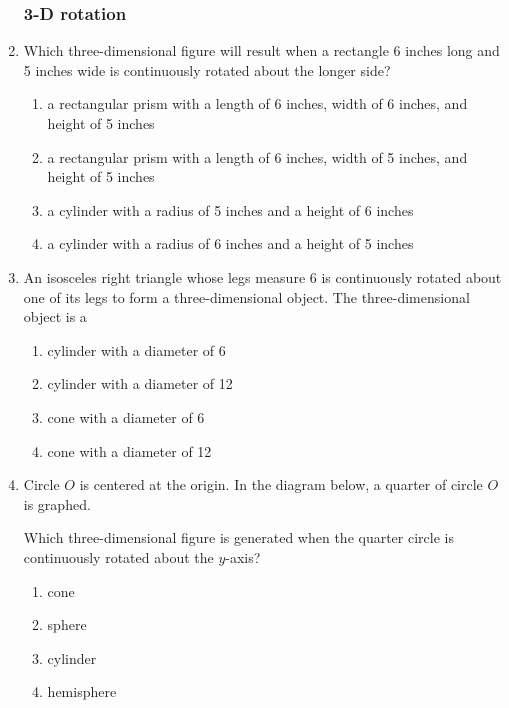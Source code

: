 \documentclass[12pt, oneside]{article}
\begin{document}
\begin{enumerate}[itemsep=0cm]
\subsubsection*{3-D rotation}
\item Which three-dimensional figure will result when a rectangle 6 inches long and 5 inches wide is continuously rotated about the longer side?
\begin{enumerate}
  \item a rectangular prism with a length of 6 inches, width of 6 inches, and height of 5 inches
  \item a rectangular prism with a length of 6 inches, width of 5 inches, and height of 5 inches
  \item a cylinder with a radius of 5 inches and a height of 6 inches
  \item a cylinder with a radius of 6 inches and a height of 5 inches
\end{enumerate}

\item An isosceles right triangle whose legs measure 6 is continuously rotated about one of its legs to form a three-dimensional object. The three-dimensional object is a
  \begin{enumerate}
    \item cylinder with a diameter of 6
    \item cylinder with a diameter of 12
    \item cone with a diameter of 6
    \item cone with a diameter of 12
  \end{enumerate}

\item Circle $O$ is centered at the origin. In the diagram below, a quarter of circle $O$ is graphed.
  \begin{center}
    \end{center}
  Which three-dimensional figure is generated when the quarter circle is continuously rotated about the $y$-axis?
  \begin{multicols}{2}
    \begin{enumerate}
    \item cone
    \item sphere
    \item cylinder
    \item hemisphere
    \end{enumerate}
  \end{multicols}


\end{enumerate}
\end{document}
